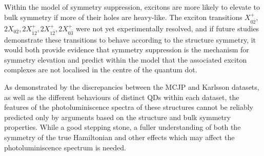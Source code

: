 Within the model of symmetry suppression, excitons are more likely to elevate to bulk symmetry if more of their holes are heavy-like. The exciton transitions $X^+_{0\bar{2}}$, $2X_{0\bar{2}}, 2X^+_{\bar{1}2}, 2X^+_{1\bar{2}}, 2X^+_{0\bar{3}}$ were not yet experimentally resolved, and if future studies demonstrate these transitions to behave according to the structure symmetry, it would both provide evidence that symmetry suppression is the mechanism for symmetry elevation and predict within the model that the associated exciton complexes are not localised in the centre of the quantum dot.

As demonstrated by the discrepancies between the MCJP and Karlsson datasets, as well as the different behaviours of distinct QDs within each dataset, the features of the photoluminiscence spectra of these structures cannot be reliably predicted only by arguments based on the structure and bulk symmetry properties. While a good stepping stone, a fuller understanding of both the symmetry of the true Hamiltonian and other effects which may affect the photoluminiscence spectrum is needed.
